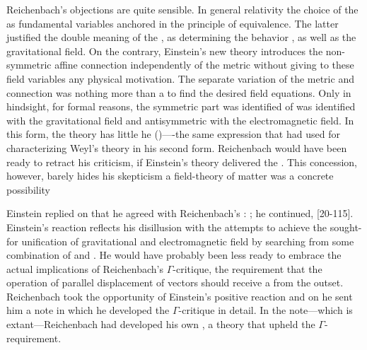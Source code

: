 \documentclass[draft]{article}
\newcommand{\WT}{Weyl's theory\xspace}
\begin{document}
Reichenbach's objections are quite sensible. In general relativity the choice of the \gmn as fundamental variables anchored in the principle of equivalence. The latter justified the double meaning of the \gmn, as determining the behavior \rac, as well as the gravitational field. On the contrary, Einstein's new theory introduces the non-symmetric affine connection \Gtmn independently of the metric \gmn without giving to these field variables any physical motivation. The separate variation of the metric and connection was nothing more than a  to find the desired field equations. Only in hindsight, for formal reasons, the symmetric part was identified of \gmn was identified with the gravitational field and antisymmetric with the electromagnetic field. In this form, the theory has little he  ()----the same expression that \citet[367]{Reichenbach1921} had used for characterizing \WT in his second form. Reichenbach would have been ready to retract his criticism, if Einstein's theory delivered the . This concession, however, barely hides his skepticism a field-theory of matter was a concrete possibility 

Einstein replied on   that he agreed with Reichenbach's : ;  he continued,  [20-115]. Einstein's reaction reflects his disillusion with the attempts to achieve the sought-for unification of gravitational and electromagnetic field by searching from some combination of \Gtmn and \gmn. He would have probably been less ready to embrace the actual implications of Reichenbach's $\Gamma$-critique, the requirement that the operation of parallel displacement of vectors should receive a  from the outset. Reichenbach took the opportunity of Einstein's positive reaction and on  he sent him a note in which he developed the $\Gamma$-critique in detail. In the note---which is extant---Reichenbach had developed his own \uft, a theory that upheld the $\Gamma$-requirement.
\end{document}
